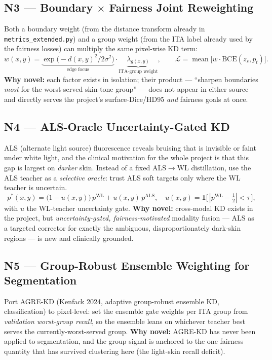 \documentclass[11pt]{article}
\begin{document}
\subsection{N3 --- Boundary $\times$ Fairness Joint Reweighting}
Both a boundary weight (from the distance transform already in
\texttt{metrics\_extended.py}) and a group weight (from the ITA label already used by the
fairness losses) can multiply the same pixel-wise KD term:
\[
w(x,y)=\underbrace{\exp\!\big(-d(x,y)^2/2\sigma^2\big)}_{\text{edge focus}}\cdot
\underbrace{\lambda_{g(x,y)}}_{\text{ITA-group weight}},\qquad
\mathcal{L} = \operatorname*{mean}\big[w\cdot\mathrm{BCE}(z_s,p_t)\big].
\]
\textbf{Why novel:} each factor exists in isolation; their product --- ``sharpen boundaries
\emph{most} for the worst-served skin-tone group'' --- does not appear in either source and
directly serves the project's surface-Dice/HD95 \emph{and} fairness goals at once.

\subsection{N4 --- ALS-Oracle Uncertainty-Gated KD}
ALS (alternate light source) fluorescence reveals bruising that is invisible or faint under
white light, and the clinical motivation for the whole project is that this gap is largest on
\emph{darker} skin. Instead of a fixed ALS$\to$WL distillation, use the ALS teacher as a
\emph{selective oracle}: trust ALS soft targets only where the WL teacher is uncertain.
\[
p^{*}(x,y)=\big(1-u(x,y)\big)\,p^{\text{WL}} + u(x,y)\,p^{\text{ALS}},\quad
u(x,y)=\mathbf{1}\!\big[\,|p^{\text{WL}}-\tfrac12| < \tau\,\big],
\]
with $u$ the WL-teacher uncertainty gate. \textbf{Why novel:} cross-modal KD exists in the
project, but \emph{uncertainty-gated, fairness-motivated} modality fusion --- ALS as a targeted
corrector for exactly the ambiguous, disproportionately dark-skin regions --- is new and
clinically grounded.

\subsection{N5 --- Group-Robust Ensemble Weighting for Segmentation}
Port AGRE-KD (Kenfack 2024, adaptive group-robust ensemble KD, classification) to
pixel-level: set the ensemble gate weights per ITA group from \emph{validation worst-group
recall}, so the ensemble leans on whichever teacher best serves the currently-worst-served
group. \textbf{Why novel:} AGRE-KD has never been applied to segmentation, and the group signal
is anchored to the one fairness quantity that has survived clustering here (the light-skin
recall deficit).
\end{document}
